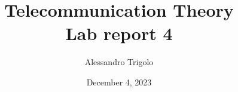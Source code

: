 \title{\vspace{160px} \textbf{\huge{Telecommunication Theory}} \\\vspace{17.5px} \LARGE{Lab report 4}  \vspace{10px}}
\author{Alessandro Trigolo}
\date{December 4, 2023}


\maketitle \newpage







